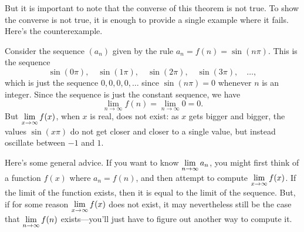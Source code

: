 But it is important to note that the converse of this theorem is
not true.  To show the converse is not true, it is enough to provide a
single example where it fails.  Here's the counterexample.

\begin{example}
  Consider the sequence $(a_n)$ given by the rule $a_n = f(n)=\sin(n\pi)$.  This is the sequence
$$
  \sin(0\pi),\quad \sin(1\pi),\quad\sin(2\pi),\quad\sin(3\pi),\quad\ldots,
$$
which is just the sequence $0, 0, 0, 0, \ldots$ since $\sin(n\pi)=0$
whenever $n$ is an integer.  Since the sequence is just the constant sequence, we have
$$
\lim_{n\to\infty} f(n)= \lim_{n\to\infty} 0 = 0. 
$$But $\displaystyle \lim_{x\to\infty}f(x)$, when $x$ is real, does not exist: as $x$ gets
bigger and bigger, the values $\sin(x\pi)$ do not get closer and
closer to a single value, but instead oscillate between $-1$ and $1$.
\end{example} 

Here's some general advice. If you want to know $\displaystyle \lim_{n\to\infty}
a_n$, you might first think of a function $f(x)$ where $a_n = f(n)$,
and then attempt to compute $\displaystyle \lim_{x\to\infty}f(x)$.  If the limit
of the function exists, then it is equal to the limit of the sequence.
But, if for some reason $\displaystyle \lim_{x\to\infty}f(x)$ does not exist, it
may nevertheless still be the case that $\displaystyle \lim_{n\to\infty}f(n)$
exists---you'll just have to figure out another way to compute it.



